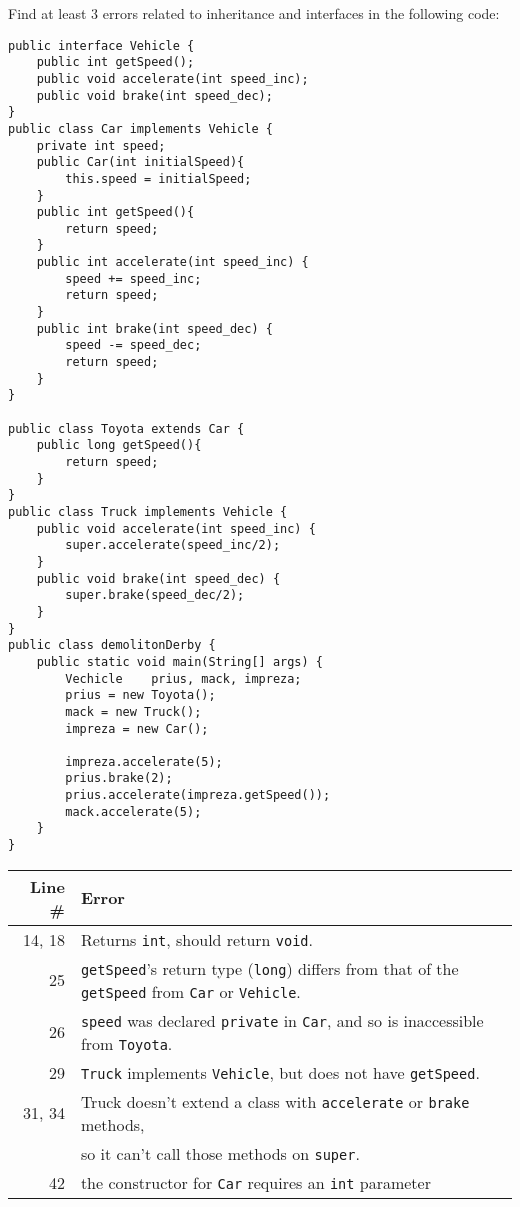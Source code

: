 %
%


Find at least 3 errors related to inheritance and interfaces in the following code:\label{demolition-derby}
\begin{lstlisting}
public interface Vehicle {
	public int getSpeed();
	public void accelerate(int speed_inc);
	public void brake(int speed_dec);
}
public class Car implements Vehicle {
	private int speed;
	public Car(int initialSpeed){
		this.speed = initialSpeed;
	}
	public int getSpeed(){
		return speed;
	}
	public int accelerate(int speed_inc) {
		speed += speed_inc;
		return speed;
	}
	public int brake(int speed_dec) {
		speed -= speed_dec;
		return speed;
	}
}

public class Toyota extends Car {
	public long getSpeed(){
		return speed;
	}
}
public class Truck implements Vehicle {
	public void accelerate(int speed_inc) {
		super.accelerate(speed_inc/2);
	}
	public void brake(int speed_dec) {
		super.brake(speed_dec/2);
	}
}
public class demolitonDerby {
	public static void main(String[] args) {
		Vechicle	prius, mack, impreza;
		prius = new Toyota();
		mack = new Truck();
		impreza = new Car();
		
		impreza.accelerate(5);
		prius.brake(2);
		prius.accelerate(impreza.getSpeed());
		mack.accelerate(5);
	}
}
\end{lstlisting}

\begin{answer}
    \begin{tabular}{r l} 
    Line \# & Error \\\hline
    14, 18  	& Returns {\tt int}, should return {\tt void}.\\
    25  	& {\tt getSpeed}'s return type ({\tt long}) differs from that of the {\tt getSpeed} from {\tt Car} or {\tt Vehicle}.\\
    26  	& {\tt speed} was declared {\tt private} in {\tt Car}, and so is inaccessible from {\tt Toyota}.\\
    29  	& {\tt Truck} implements {\tt Vehicle}, but does not have {\tt getSpeed}.\\
    31, 34  	& Truck doesn't extend a class with {\tt accelerate} or {\tt brake} methods,\\
    		& so it can't call those methods on {\tt super}.\\
    42	&	the constructor for {\tt Car} requires an {\tt int} parameter \\
    \end{tabular}
\end{answer}
